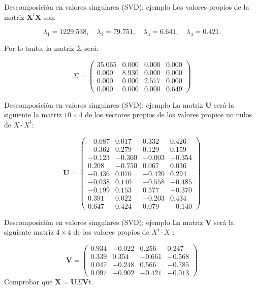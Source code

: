 \documentclass[
  ignorenonframetext,
]{beamer}
\begin{document}
\begin{frame}{Descomposición en valores singulares (SVD): ejemplo}
\label{descomposiciuxf3n-en-valores-singulares-svd-ejemplo-3}
Los valores propios de la matriz \(\mathbf{X}^t\mathbf{X}\) son:

\[
\lambda_1=1229.538,\quad \lambda_2=79.751,\quad \lambda_3=6.641, \quad  
\lambda_4= 0.421. 
\]

Por lo tanto, la matriz \(\Sigma\) será:

\[
\Sigma =\begin{pmatrix} 
35.065 & 0.000 & 0.000 & 0.000 \\ 
  0.000 & 8.930 & 0.000 & 0.000 \\ 
  0.000 & 0.000 & 2.577 & 0.000 \\ 
  0.000 & 0.000 & 0.000 & 0.649 
  \end{pmatrix}
\]
\end{frame}

\begin{frame}{Descomposición en valores singulares (SVD): ejemplo}
\label{descomposiciuxf3n-en-valores-singulares-svd-ejemplo-4}
La matriz \(\mathbf{U}\) será la siguiente la matriz \(10\times 4\) de
los vectores propios de los valores propios no nulos de \(X\cdot X^t\):

\[
\mathbf{U} =\begin{pmatrix}
-0.087 & 0.017 & 0.332 & 0.426 \\ 
  -0.362 & 0.279 & 0.129 & 0.159 \\ 
  -0.123 & -0.360 & -0.003 & -0.354 \\ 
  0.208 & -0.750 & 0.067 & 0.036 \\ 
  -0.436 & 0.076 & -0.420 & 0.294 \\ 
  -0.038 & 0.140 & -0.558 & -0.485 \\ 
  -0.199 & 0.153 & 0.577 & -0.370 \\ 
  0.391 & 0.022 & -0.203 & 0.434 \\ 
  0.647 & 0.424 & 0.079 & -0.140 
  \end{pmatrix}
\]
\end{frame}

\begin{frame}{Descomposición en valores singulares (SVD): ejemplo}
\label{descomposiciuxf3n-en-valores-singulares-svd-ejemplo-5}
La matriz \(\mathbf{V}\) será la siguiente matriz \(4\times 4\) de los
valores propios de \(X^t\cdot X\) :

\[
\mathbf{V} =\begin{pmatrix}
0.934 & -0.022 & 0.256 & 0.247 \\ 
  0.339 & 0.354 & -0.661 & -0.568 \\ 
  0.047 & -0.248 & 0.566 & -0.785 \\ 
  0.097 & -0.902 & -0.421 & -0.013
  \end{pmatrix}
\] Comprobar que \(\mathbf{X}=\mathbf{U}\Sigma\mathbf{V}t\).
\end{frame}
\end{document}
